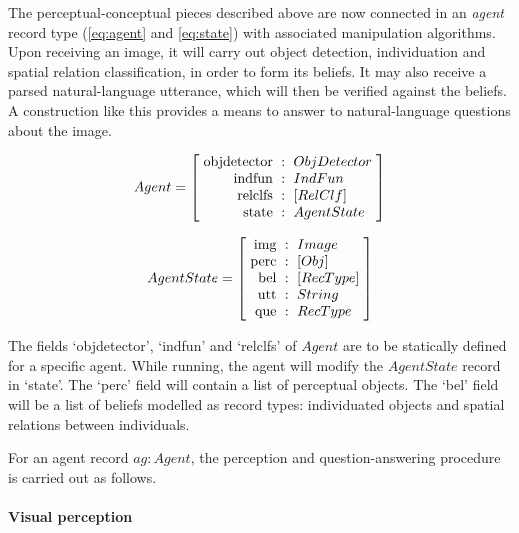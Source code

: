 The perceptual-conceptual pieces described above are now connected in an \textit{agent} record type (\autoref{eq:agent} and \autoref{eq:state}) with associated manipulation algorithms.
Upon receiving an image, it will carry out object detection, individuation and spatial relation classification, in order to form its beliefs.
It may also receive a parsed natural-language utterance, which will then be verified against the beliefs.
A construction like this provides a means to answer to natural-language questions about the image.

\begin{equation}\label{eq:agent}
Agent = \rec{
    \text{objdetector} &:& ObjDetector \\
    \text{indfun} &:& IndFun \\
    \text{relclfs} &:& [RelClf] \\
    \text{state} &:& AgentState \\
    }
\end{equation}

\begin{equation}\label{eq:state}
AgentState = \rec{
    \text{img} &:& Image \\
    \text{perc} &:& [Obj] \\
    \text{bel} &:& [RecType] \\
    \text{utt} &:& String \\
    \text{que} &:& RecType \\
    }
\end{equation}

The fields `objdetector', `indfun' and `relclfs' of $Agent$ are to be statically defined for a specific agent.
While running, the agent will modify the $AgentState$ record in `state'.
The `perc' field will contain a list of perceptual objects.
The `bel' field will be a list of beliefs modelled as record types:
individuated objects and spatial relations between individuals.

For an agent record $ag : Agent$, the perception and question-answering procedure is carried out as follows.

\paragraph{Visual perception}

